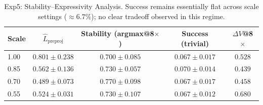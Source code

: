 \begin{table}[t]
\centering
\caption{Exp5: Stability--Expressivity Analysis. Success remains essentially flat across scale settings ($\approx 6.7\%$); no clear tradeoff observed in this regime.}
\label{tab:exp5-tradeoff}
\begin{tabular}{lcccc}
\toprule
Scale & $\hat{L}_{\text{preproj}}$ & Stability (argmax@8$\times$) & Success (trivial) & $\Delta V$@8$\times$ \\
\midrule
1.00 & $0.801 \pm 0.238$ & $0.700 \pm 0.085$ & $0.067 \pm 0.017$ & $0.528$ \\
0.85 & $0.562 \pm 0.136$ & $0.730 \pm 0.057$ & $0.070 \pm 0.014$ & $0.439$ \\
0.70 & $0.489 \pm 0.073$ & $0.770 \pm 0.098$ & $0.067 \pm 0.017$ & $0.458$ \\
0.55 & $0.524 \pm 0.031$ & $0.730 \pm 0.107$ & $0.067 \pm 0.012$ & $0.680$ \\
\bottomrule
\end{tabular}
\end{table}
